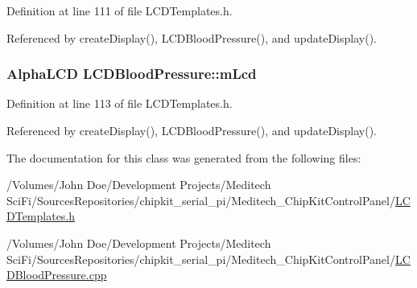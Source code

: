 Definition at line 111 of file L\-C\-D\-Templates.\-h.



Referenced by create\-Display(), L\-C\-D\-Blood\-Pressure(), and update\-Display().

\hypertarget{class_l_c_d_blood_pressure_abb80767c8e4d018ced0356fe1623577f}{
\subsubsection[{m\-Lcd}]{\setlength{\rightskip}{0pt plus 5cm}Alpha\-L\-C\-D L\-C\-D\-Blood\-Pressure\-::m\-Lcd\hspace{0.3cm}{\ttfamily [private]}}}\label{class_l_c_d_blood_pressure_abb80767c8e4d018ced0356fe1623577f}


Definition at line 113 of file L\-C\-D\-Templates.\-h.



Referenced by create\-Display(), L\-C\-D\-Blood\-Pressure(), and update\-Display().



The documentation for this class was generated from the following files\-:\begin{DoxyCompactItemize}
\item 
/\-Volumes/\-John Doe/\-Development Projects/\-Meditech Sci\-Fi/\-Sources\-Repositories/chipkit\-\_\-serial\-\_\-pi/\-Meditech\-\_\-\-Chip\-Kit\-Control\-Panel/\hyperlink{_l_c_d_templates_8h}{L\-C\-D\-Templates.\-h}\item 
/\-Volumes/\-John Doe/\-Development Projects/\-Meditech Sci\-Fi/\-Sources\-Repositories/chipkit\-\_\-serial\-\_\-pi/\-Meditech\-\_\-\-Chip\-Kit\-Control\-Panel/\hyperlink{_l_c_d_blood_pressure_8cpp}{L\-C\-D\-Blood\-Pressure.\-cpp}\end{DoxyCompactItemize}
